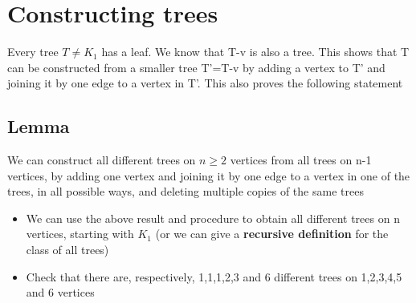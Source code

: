 \documentclass{article}[18pt]
\begin{document}
\section{Constructing trees}
Every tree $T\neq K_1$ has a leaf. We know that T-v is also a tree. This shows that T can be constructed from a smaller tree T'=T-v by adding a vertex to T' and joining it by one edge to a vertex in T'. This also proves the following statement
\subsection{Lemma}
We can construct all different trees on $n\geqslant 2$ vertices from all trees on n-1 vertices, by adding one vertex and joining it by one edge to a vertex in one of the trees, in all possible ways, and deleting multiple copies of the same trees
\begin{itemize}
	\item We can use the above result and procedure to obtain all different trees on n vertices, starting with $K_1$ (or we can give a \textbf{recursive definition} for the class of all trees)
	\item Check that there are, respectively, 1,1,1,2,3 and 6 different trees on 1,2,3,4,5 and 6 vertices
\end{itemize}
\end{document}
